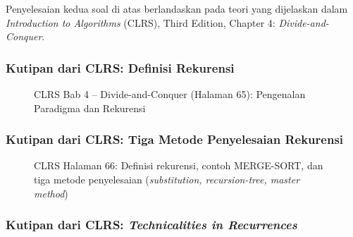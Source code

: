 \documentclass[12pt,a4paper]{article}
\theoremstyle{definition}
\begin{document}
Penyelesaian kedua soal di atas berlandaskan pada teori yang dijelaskan dalam
\emph{Introduction to Algorithms} (CLRS), Third Edition, Chapter 4:
\emph{Divide-and-Conquer}.

\subsubsection{Kutipan dari CLRS: Definisi Rekurensi}

\begin{figure}[H]
  \centering
  \caption{CLRS Bab 4 -- Divide-and-Conquer (Halaman 65): Pengenalan Paradigma
           dan Rekurensi}
\end{figure}

\subsubsection{Kutipan dari CLRS: Tiga Metode Penyelesaian Rekurensi}

\begin{figure}[H]
  \centering
  \caption{CLRS Halaman 66: Definisi rekurensi, contoh MERGE-SORT, dan tiga
           metode penyelesaian (\emph{substitution, recursion-tree, master method})}
\end{figure}

\subsubsection{Kutipan dari CLRS: \textit{Technicalities in Recurrences}}
\end{document}
